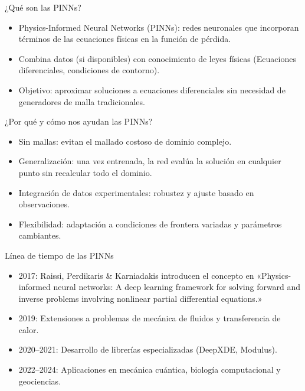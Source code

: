 
\begin{frame}{¿Qué son las PINNs?}
  \begin{itemize}
    \item Physics-Informed Neural Networks (PINNs): redes neuronales que incorporan términos de las ecuaciones físicas en la función de pérdida.
    \item Combina datos (si disponibles) con conocimiento de leyes físicas (Ecuaciones diferenciales, condiciones de contorno).
    \item Objetivo: aproximar soluciones a ecuaciones diferenciales sin necesidad de generadores de malla tradicionales.
  \end{itemize}
\end{frame}

\begin{frame}{¿Por qué y cómo nos ayudan las PINNs?}
  \begin{itemize}
    \item Sin mallas: evitan el mallado costoso de dominio complejo.
    \item Generalización: una vez entrenada, la red evalúa la solución en cualquier punto sin recalcular todo el dominio.
    \item Integración de datos experimentales: robustez y ajuste basado en observaciones.
    \item Flexibilidad: adaptación a condiciones de frontera variadas y parámetros cambiantes.
  \end{itemize}
\end{frame}

\begin{frame}{Línea de tiempo de las PINNs}
  \begin{itemize}
    \item 2017: Raissi, Perdikaris & Karniadakis introducen el concepto en «Physics-informed neural networks: A deep learning framework for solving forward and inverse problems involving nonlinear partial differential equations.»
    \item 2019: Extensiones a problemas de mecánica de fluidos y transferencia de calor.
    \item 2020–2021: Desarrollo de librerías especializadas (DeepXDE, Modulus).
    \item 2022–2024: Aplicaciones en mecánica cuántica, biología computacional y geociencias.
  \end{itemize}
\end{frame}

